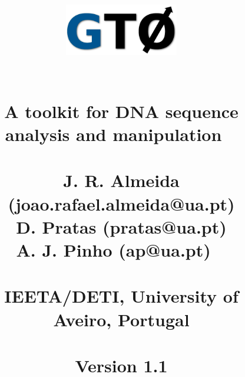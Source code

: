 \documentclass[11pt,journal,compsoc]{report}[1]
\begin{document}
\title{
%
\begin{figure}[h!]
\centerline{\includegraphics[width=5cm]{../imgs/logo.pdf}}
\label{logo}
\end{figure}
~\\
\textbf{A toolkit for DNA sequence\\ analysis and manipulation}
~\\~\\
\large
J. R. Almeida (joao.rafael.almeida@ua.pt)\\
D. Pratas (pratas@ua.pt)\\
A. J. Pinho (ap@ua.pt)
~\\~\\
\small
IEETA/DETI, University of Aveiro, Portugal\\
~\\
Version 1.1
}
\date{}
\maketitle

\tableofcontents

\def \FASTQToolsPath {sections/FASTQ_tools}







\end{document}
